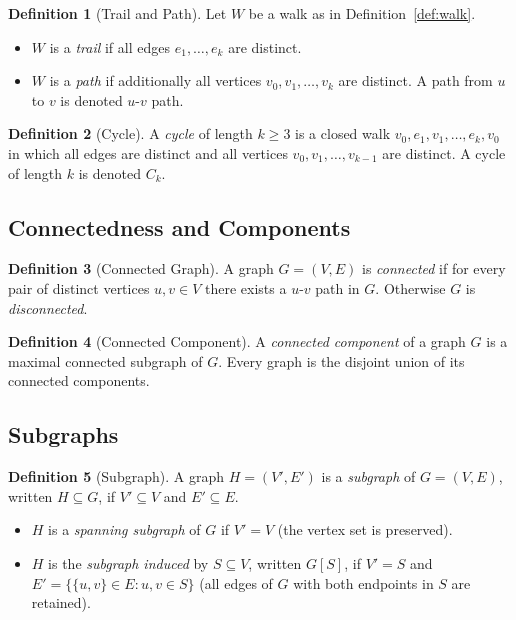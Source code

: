 \documentclass[12pt,a4paper]{article}
\theoremstyle{definition}
\newtheorem{definition}{Definition}[section]
\theoremstyle{plain}
\begin{document}
\begin{definition}[Trail and Path]\label{def:trail-path}
  Let \(W\) be a walk as in Definition~\ref{def:walk}.
  \begin{itemize}
    \item \(W\) is a \emph{trail} if all edges \(e_1, \ldots, e_k\) are
          distinct.
    \item \(W\) is a \emph{path} if additionally all vertices
          \(v_0, v_1, \ldots, v_k\) are distinct.  A path from \(u\) to
          \(v\) is denoted \(u\text{-}v\) path.
  \end{itemize}
\end{definition}

\begin{definition}[Cycle]\label{def:cycle}
  A \emph{cycle} of length \(k \ge 3\) is a closed walk
  \(v_0, e_1, v_1, \ldots, e_k, v_0\) in which all edges are distinct and
  all vertices \(v_0, v_1, \ldots, v_{k-1}\) are distinct.  A cycle of
  length \(k\) is denoted \(C_k\).
\end{definition}

\subsection{Connectedness and Components}

\begin{definition}[Connected Graph]\label{def:connected}
  A graph \(G = (V,E)\) is \emph{connected} if for every pair of distinct
  vertices \(u, v \in V\) there exists a \(u\text{-}v\) path in \(G\).
  Otherwise \(G\) is \emph{disconnected}.
\end{definition}

\begin{definition}[Connected Component]\label{def:component}
  A \emph{connected component} of a graph \(G\) is a maximal connected
  subgraph of \(G\).  Every graph is the disjoint union of its connected
  components.
\end{definition}

\subsection{Subgraphs}

\begin{definition}[Subgraph]\label{def:subgraph}
  A graph \(H = (V', E')\) is a \emph{subgraph} of \(G = (V,E)\),
  written \(H \subseteq G\), if \(V' \subseteq V\) and \(E' \subseteq E\).
  \begin{itemize}
    \item \(H\) is a \emph{spanning subgraph} of \(G\) if \(V' = V\)
          (the vertex set is preserved).
    \item \(H\) is the \emph{subgraph induced} by \(S \subseteq V\),
          written \(G[S]\), if \(V' = S\) and
          \(E' = \{\{u,v\} \in E : u,v \in S\}\)
          (all edges of \(G\) with both endpoints in \(S\) are retained).
  \end{itemize}
\end{definition}
\end{document}
